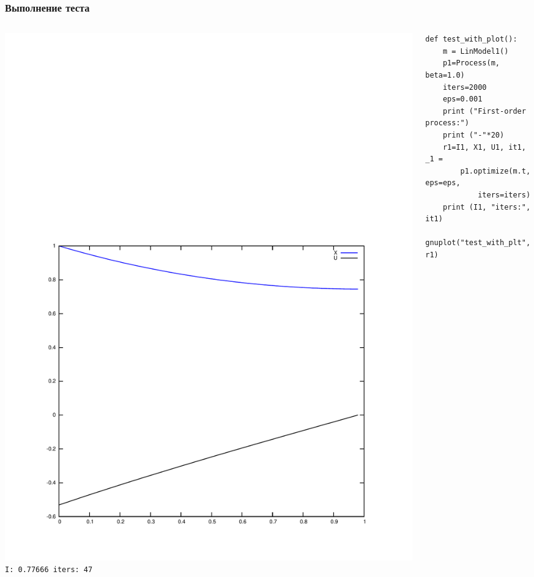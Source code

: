 \documentclass[10pt]{beamer}
\begin{document}
\begin{frame}[fragile]
  \frametitle{Выполнение теста}
\begin{columns}
\begin{column}{0.43\columnwidth}
\vspace{-3em}
\includegraphics[width=1.2\textwidth]{1dplot}
\vspace{1em}
\texttt{I: 0.77666 iters: 47}
\end{column}
\begin{column}{0.57\columnwidth}
\begin{lstlisting}
def test_with_plot():
    m = LinModel1()
    p1=Process(m, beta=1.0)
    iters=2000
    eps=0.001
    print ("First-order process:")
    print ("-"*20)
    r1=I1, X1, U1, it1, _1 =
        p1.optimize(m.t, eps=eps,
            iters=iters)
    print (I1, "iters:", it1)
    gnuplot("test_with_plt", r1)
\end{lstlisting}
\end{column}
\end{columns}
\end{frame}
\end{document}
